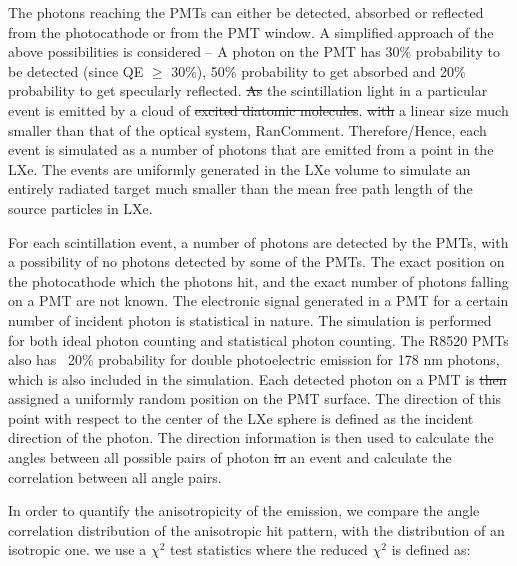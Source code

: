 The photons reaching the PMTs can either be detected, absorbed or reflected from the photocathode 
or from the PMT window. A simplified approach of the above possibilities is considered -- 
A photon  on the PMT has  30\% probability to be detected (since QE $\geq$ 30\%), 50\% probability to get 
absorbed and 20\% probability to get specularly reflected. \sout{As} the scintillation light in a particular 
event is emitted by a cloud of \sout{excited diatomic molecules}.  \sout{with} a linear size much smaller than that 
of the optical system, RanComment{. Therefore/Hence,} each event is simulated as a number of photons that are emitted from a point 
in the LXe. The events are uniformly generated in the LXe volume to simulate an entirely radiated 
target much smaller than the mean free path length of the source particles in LXe.

For each scintillation event, a number of photons are detected by the PMTs, with a possibility of 
no photons detected by some of the PMTs. The exact position on the photocathode which the photons hit, 
and the exact number of photons falling on a PMT are not known. The electronic signal generated in a PMT 
for a certain number of incident photon is statistical in nature. The simulation is performed for both 
ideal photon counting and statistical photon counting. The R8520 PMTs also has  ~20\% probability 
for double photoelectric emission for 178 nm photons, which is also included in the simulation.
Each detected photon 
on a PMT is \sout{then} assigned a uniformly random position on the PMT surface. The direction of this point with respect 
to the center of the LXe sphere is defined as the incident direction of the photon. The direction information 
is then used to calculate the angles between all possible pairs of photon \sout{in} an event and calculate the correlation between all angle pairs.


In order to quantify the anisotropicity of the emission, we compare the angle correlation distribution of the anisotropic hit pattern, with the distribution of an isotropic one. we use a $\chi^2$ test statistics where the reduced $\chi^2$ is defined as: 

